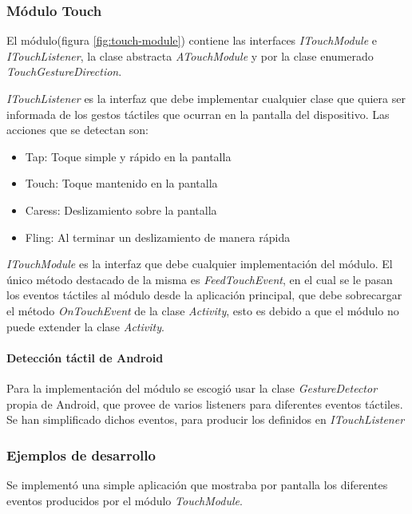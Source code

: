 \subsubsection{Módulo Touch}
El módulo(figura \ref{fig:touch-module}) contiene las interfaces \textit{ITouchModule} e \textit{ITouchListener}, la clase abstracta \textit{ATouchModule} y por la clase enumerado \textit{TouchGestureDirection}.

\textit{ITouchListener} es la interfaz que debe implementar cualquier clase que quiera ser informada de los gestos táctiles que ocurran en la pantalla del dispositivo. Las acciones que se detectan son:

\begin{itemize}
	\item  Tap: Toque simple y rápido en la pantalla
	\item  Touch: Toque mantenido en la pantalla
	\item  Caress: Deslizamiento sobre la pantalla
	\item  Fling: Al terminar un deslizamiento de manera rápida
\end{itemize}


\textit{ITouchModule} es la interfaz que debe cualquier implementación del módulo. El único método destacado de la misma es \textit{FeedTouchEvent}, en el cual se le pasan los eventos táctiles al módulo desde la aplicación principal, que debe sobrecargar el método \textit{OnTouchEvent} de la clase \textit{Activity}, esto es debido a que el módulo no puede extender la clase \textit{Activity}.

\paragraph*{Detección táctil de Android\\}


Para la implementación del módulo se escogió usar la clase \textit{GestureDetector} propia de Android, que provee de varios listeners para diferentes eventos táctiles.
Se han simplificado dichos eventos, para producir los definidos en \textit{ITouchListener}

\subsubsection*{Ejemplos de desarrollo}

Se implementó una simple aplicación que mostraba por pantalla los diferentes eventos producidos por el módulo \textit{TouchModule}.


